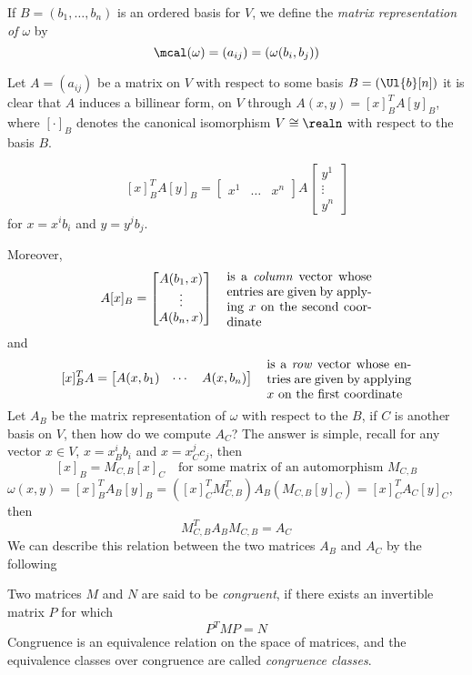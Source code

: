 \documentclass[../main-v2-manifolds.tex]{subfiles}
\begin{document}
    \begin{definition}
        If $B=(b_1,\ldots,b_n)$ is an ordered basis for $V$, we define the \emph{matrix representation of $\omega$} by
        \[
            \mcal(\omega) = (a_{ij}) = (\omega(b_i, b_j))
        \]
    \end{definition}
    \begin{wts}
        Let $A = (a_{ij})$ be a matrix on $V$ with respect to some basis $B = (\Ul{b}[n])$ it is clear that $A$ induces a billinear form, on $V$ through $A(x,y) = [x]_B^TA[y]_B$, where $[\cdot]_B$ denotes the canonical isomorphism $V\cong \realn$ with respect to the basis $B$.

        \[
            [x]_B^T A [y]_B = \begin{bmatrix}
                x^1 &\ldots & x^n
            \end{bmatrix}A \begin{bmatrix}
                y^1\\
                \vdots\\
                y^n
            \end{bmatrix}
        \]
        for $x = x^ib_i$ and $y = y^jb_j$. 
    \end{wts}
    Moreover,
        \[
            A[x]_B = \begin{bmatrix}
                A(b_1,x)\\
                \vdots\\
                A(b_n,x)
            \end{bmatrix}\quad \parbox{4cm}{is a \emph{column} vector whose entries are given by applying $x$ on the second coordinate}
        \]
        and 
        \[
            [x]_B^T A = \begin{bmatrix}
                A(x,b_1) & \cdots & A(x, b_n)
            \end{bmatrix}\quad\parbox{4cm}{is a \emph{row} vector whose entries are given by applying $x$ on the first coordinate}
        \]
    Let $A_B$ be the matrix representation of $\omega$ with respect to the $B$, if $C$ is another basis on $V$, then how do we compute $A_C$? The answer is simple, recall for any vector $x\in V$, $x = x^i_Bb_i$ and $x = x^j_C c_j$, then
    \[
        [x]_B = M_{C,B}[x]_C\quad\text{for some matrix of an automorphism }M_{C,B}
    \]
    $\omega(x,y) = [x]_B^TA_B[y]_B = ([x]_C^TM_{C,B}^T)A_B(M_{C,B}[y]_C) = [x]_C^T A_C [y]_C$, then
    \begin{equation}\label{lee-chp22:congruent-matrices}
        M^T_{C,B}A_BM_{C,B} = A_C
    \end{equation}
    We can describe this relation between the two matrices $A_B$ and $A_C$ by the following
    \begin{definition}
        Two matrices $M$ and $N$ are said to be \emph{congruent}, if there exists an invertible matrix $P$ for which
        \[
            P^TMP = N
        \]
        Congruence is an equivalence relation on the space of matrices, and the equivalence classes over congruence are called \emph{congruence classes}.
    \end{definition}
    
\end{document}
